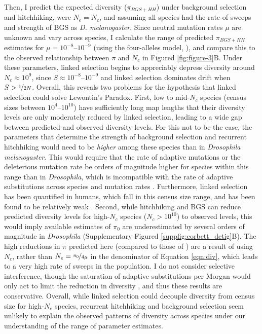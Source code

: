 \documentclass[11pt]{article}
\begin{document}
Then, I predict the expected diversity ($\pi_{BGS+HH}$) under background
selection and hitchhiking, were $N_e= N_c$, and assuming all species had the
rate of sweeps and strength of BGS as \emph{D. melanogaster}. Since neutral
mutation rates $\mu$ are unknown and vary across species, I calculate the range
of predicted $\pi_{BGS+HH}$ estimates for $\mu = 10^{-8}$--$10^{-9}$ (using the
four-alleles model, \cite{Tajima1996-rb}), and compare this to the observed
relationship between $\pi$ and $N_c$ in Figured \ref{fig:figure-3}B.  Under
these parameters, linked selection begins to appreciably depress diversity
around $N_c \approx 10^9$, since $S \approx 10^{-8}$--$10^{-9}$ and linked
selection dominates drift when $S > \nicefrac{1}{2N}$.  Overall, this reveals
two problems for the hypothesis that linked selection could solve Lewontin's
Paradox. First, low to mid-$N_c$ species (census sizes between
$10^{4}$--$10^{10}$) have sufficiently long map lengths that their diversity
levels are only moderately reduced by linked selection, leading to a wide gap
between predicted and observed diversity levels. For this not to be the case,
the parameters that determine the strength of background selection and
recurrent hitchhiking would need to be \emph{higher} among these species than
in \emph{Drosophila melanogaster}. This would require that the rate of adaptive
mutations or the deleterious mutation rate be orders of magnitude higher for
species within this range than in \emph{Drosophila}, which is incompatible with
the rate of adaptive substitutions across species \parencite{Galtier2016-dq}
and mutation rates \parencite{Lynch2010-ki}. Furthermore, linked selection has
been quantified in humans, which fall in this census size range, and has been
found to be relatively weak
\parencite{McVicker2009-ax,Hernandez2011-gs,Hellmann2008-ic,Cai2009-by,Boyko2008-tj}.
Second, while hitchhiking and BGS can reduce predicted diversity levels for
high-$N_c$ species ($N_c > 10^{10}$) to observed levels, this would imply
available estimates of $\pi_0$ are underestimated by several orders of
magnitude in \emph{Drosophila} (Supplementary Figured
\ref{suppfig:corbett_detig}B). The high reductions in $\pi$ predicted here
(compared to those of \cite{Elyashiv2016-vt}) are a result of using $N_c$,
rather than $N_e = \nicefrac{\pi_0}{4 \mu}$ in the denominator of Equation
\eqref{eqn:div}, which leads to a very high rate of sweeps in the population.
I do not consider selective interference, though the saturation of adaptive
substitutions per Morgan would only act to limit the reduction in diversity
\parencite{Weissman2012-aa}, and thus these results are conservative.
Overall, while linked selection could decouple diversity from census size for
high-$N_c$ species, recurrent hitchhiking and background selection seem
unlikely to explain the observed patterns of diversity across species under our
understanding of the range of parameter estimates.
\end{document}

